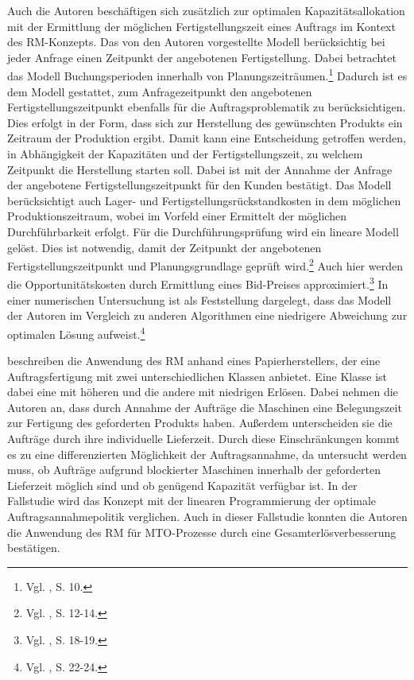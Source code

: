 Auch die Autoren \cite{guhlich2015revenue} beschäftigen sich zusätzlich zur optimalen Kapazitätsallokation mit der Ermittlung der möglichen Fertigstellungszeit eines Auftrags im Kontext des RM-Konzepts. Das von den Autoren vorgestellte Modell berücksichtig bei jeder Anfrage einen Zeitpunkt der angebotenen Fertigstellung. Dabei betrachtet das Modell Buchungsperioden innerhalb von Planungszeiträumen.\footnote{Vgl. \cite{guhlich2015revenue}, S. 10.} Dadurch ist es dem Modell gestattet, zum Anfragezeitpunkt den angebotenen Fertigstellungszeitpunkt ebenfalls für die Auftragsproblematik zu berücksichtigen. Dies erfolgt in der Form, dass sich zur Herstellung des gewünschten Produkts ein Zeitraum der Produktion ergibt. Damit kann eine Entscheidung getroffen werden, in Abhängigkeit der Kapazitäten und der Fertigstellungszeit, zu welchem Zeitpunkt die Herstellung starten soll. Dabei ist mit der Annahme der Anfrage der angebotene Fertigstellungszeitpunkt für den Kunden bestätigt. Das Modell berücksichtigt auch Lager- und Fertigstellungsrückstandkosten in dem möglichen Produktionszeitraum, wobei im Vorfeld einer Ermittelt der möglichen Durchführbarkeit erfolgt. Für die Durchführungsprüfung wird ein lineare Modell gelöst. Dies ist notwendig, damit der Zeitpunkt der angebotenen Fertigstellungszeitpunkt und Planungsgrundlage geprüft wird.\footnote{Vgl. \cite{guhlich2015revenue}, S. 12-14.} Auch hier werden die Opportunitätskosten durch Ermittlung eines Bid-Preises approximiert.\footnote{Vgl. \cite{guhlich2015revenue}, S. 18-19.} In einer numerischen Untersuchung ist als Feststellung dargelegt, dass das Modell der Autoren im Vergleich zu anderen Algorithmen eine niedrigere Abweichung zur optimalen Lösung aufweist.\footnote{Vgl. \cite{guhlich2015revenue}, S. 22-24.}

\cite{kuhn2004revenue} beschreiben die Anwendung des RM anhand eines Papierherstellers, der eine Auftragsfertigung mit zwei unterschiedlichen Klassen anbietet. Eine Klasse ist dabei eine mit höheren und die andere mit niedrigen Erlösen. Dabei nehmen die Autoren an, dass durch Annahme der Aufträge die Maschinen eine Belegungszeit zur Fertigung des geforderten Produkts haben. Außerdem unterscheiden sie die Aufträge durch ihre individuelle Lieferzeit. Durch diese Einschränkungen kommt es zu eine differenzierten Möglichkeit der Auftragsannahme, da untersucht werden muss, ob Aufträge aufgrund blockierter Maschinen innerhalb der geforderten Lieferzeit möglich sind und ob genügend Kapazität verfügbar ist. In der Fallstudie wird das Konzept mit der linearen Programmierung der optimale Auftragsannahmepolitik verglichen. Auch in dieser Fallstudie konnten die Autoren die Anwendung des RM für MTO-Prozesse durch eine Gesamterlösverbesserung bestätigen.

